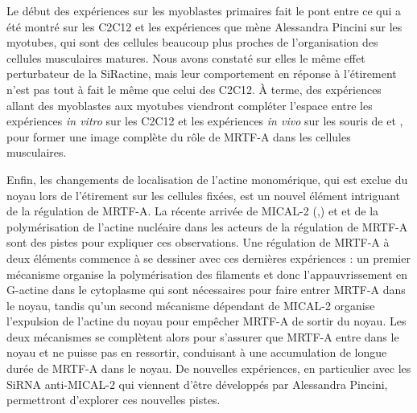 Le début des expériences sur les myoblastes primaires fait le pont entre ce qui a été montré sur les C2C12 et les expériences que mène Alessandra Pincini sur les myotubes, qui sont des cellules beaucoup plus proches de l'organisation des cellules musculaires matures. 
Nous avons constaté sur elles le même effet perturbateur de la SiRactine, mais leur comportement en réponse à l'étirement n'est pas tout à fait le même que celui des C2C12. 
À terme, des expériences allant des myoblastes aux myotubes viendront compléter l'espace entre les expériences \textit{in vitro} sur les C2C12 et les expériences \textit{in vivo} sur les souris de \cite{guerci_srf-dependent_2012} et \cite{collard_nuclear_2014}, pour former une image complète du rôle de MRTF-A dans les cellules musculaires. 

Enfin, les changements de localisation de l'actine monomérique, qui est exclue du noyau lors de l'étirement sur les cellules fixées, est un nouvel élément intriguant de la régulation de MRTF-A. La récente arrivée de MICAL-2  (\cite{lundquist_redox_2014},\cite{collard_nuclear_2014}) et et de la polymérisation de l'actine nucléaire \parencite{baarlink_nuclear_2013} dans les acteurs de la régulation de MRTF-A sont des pistes pour expliquer ces observations. Une régulation de MRTF-A à deux éléments commence à se dessiner avec ces dernières expériences : un premier mécanisme organise la polymérisation des filaments et donc l'appauvrissement en G-actine dans le cytoplasme qui sont nécessaires pour faire entrer MRTF-A dans le noyau, tandis qu'un second mécanisme dépendant de MICAL-2 organise l'expulsion de l'actine du noyau pour empêcher MRTF-A de sortir du noyau. Les deux mécanismes se complètent alors pour s'assurer que MRTF-A entre dans le noyau et ne puisse pas en ressortir, conduisant à une accumulation de longue durée de MRTF-A dans le noyau.
De nouvelles expériences, en particulier avec les SiRNA anti-MICAL-2 qui viennent d'être développés par Alessandra Pincini, permettront d'explorer ces nouvelles pistes. 








%